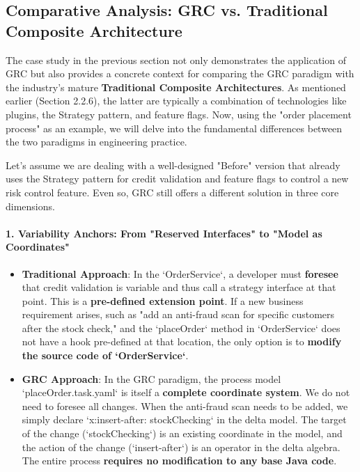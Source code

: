 \documentclass[11pt]{article}
\begin{document}
\subsection{Comparative Analysis: GRC vs. Traditional Composite Architecture}

The case study in the previous section not only demonstrates the application of GRC but also provides a concrete context for comparing the GRC paradigm with the industry's mature \textbf{Traditional Composite Architectures}. As mentioned earlier (Section 2.2.6), the latter are typically a combination of technologies like plugins, the Strategy pattern, and feature flags. Now, using the "order placement process" as an example, we will delve into the fundamental differences between the two paradigms in engineering practice.

Let's assume we are dealing with a well-designed "Before" version that already uses the Strategy pattern for credit validation and feature flags to control a new risk control feature. Even so, GRC still offers a different solution in three core dimensions.

\paragraph{1. Variability Anchors: From "Reserved Interfaces" to "Model as Coordinates"}
\begin{itemize}
    \item \textbf{Traditional Approach}: In the `OrderService`, a developer must \textbf{foresee} that credit validation is variable and thus call a strategy interface at that point. This is a \textbf{pre-defined extension point}. If a new business requirement arises, such as "add an anti-fraud scan for specific customers after the stock check," and the `placeOrder` method in `OrderService` does not have a hook pre-defined at that location, the only option is to \textbf{modify the source code of `OrderService`}.
    \item \textbf{GRC Approach}: In the GRC paradigm, the process model `placeOrder.task.yaml` is itself a \textbf{complete coordinate system}. We do not need to foresee all changes. When the anti-fraud scan needs to be added, we simply declare `x:insert-after: stockChecking` in the delta model. The target of the change (`stockChecking`) is an existing coordinate in the model, and the action of the change (`insert-after`) is an operator in the delta algebra. The entire process \textbf{requires no modification to any base Java code}.
\end{itemize}
\end{document}
